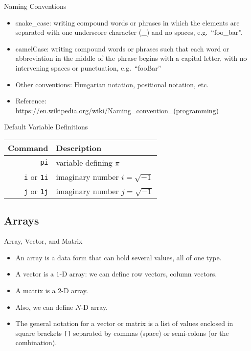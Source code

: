 \begin{frame}{Naming Conventions}
\protect\hypertarget{naming-conventions}{}
\begin{itemize}[<+->]
\tightlist
\item
  snake\_case: writing compound words or phrases in which the elements
  are separated with one underscore character (\_) and no spaces,
  e.g.~``foo\_bar''.
\item
  camelCase: writing compound words or phrases such that each word or
  abbreviation in the middle of the phrase begins with a capital letter,
  with no intervening spaces or punctuation, e.g.~``fooBar''
\item
  Other conventions: Hungarian notation, positional notation, etc.
\item
  Reference:
  \url{https://en.wikipedia.org/wiki/Naming_convention_(programming)}
\end{itemize}
\end{frame}

\begin{frame}{Default Variable Definitions}
\protect\hypertarget{default-variable-definitions}{}
\begin{table}[!hbtp]
    \begin{tabular}{rl}
        Command & Description \\
        \hline
        \texttt{pi} & variable defining $\pi$ \\
        \texttt{i} or \texttt{1i} & imaginary number $i = \sqrt{-1}$ \\
        \texttt{j} or \texttt{1j} & imaginary number $j = \sqrt{-1}$
    \end{tabular}
\end{table}
\end{frame}

\hypertarget{arrays}{%
\subsection{Arrays}\label{arrays}}

\begin{frame}[fragile]{Array, Vector, and Matrix}
\protect\hypertarget{array-vector-and-matrix}{}
\begin{itemize}[<+->]
\tightlist
\item
  An array is a data form that can hold several values, all of one type.
\item
  A vector is a \(1\)-D array: we can define row vectors, column
  vectors.
\item
  A matrix is a \(2\)-D array.
\item
  Also, we can define \(N\)-D array.
\item
  The general notation for a vector or matrix is a list of values
  enclosed in square brackets \texttt{{[}{]}} separated by commas
  (space) or semi-colons (or the combination).
\end{itemize}
\end{frame}

